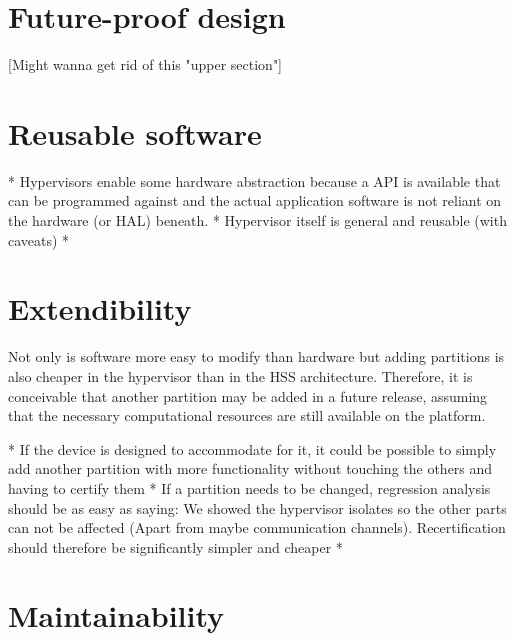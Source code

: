 
\section{Future-proof design}
[Might wanna get rid of this "upper section"]


\section{Reusable software}
* Hypervisors enable some hardware abstraction because a API is available that can be programmed against and the actual application software is not reliant on the hardware (or HAL) beneath.
* Hypervisor itself is general and reusable (with caveats)
* 


\section{Extendibility}
Not only is software more easy to modify than hardware but adding partitions is also cheaper in the hypervisor than in the \gls{HSS} architecture. Therefore, it is conceivable that another partition may be added in a future release, assuming that the necessary computational resources are still available on the platform. 

* If the device is designed to accommodate for
it, it could be possible to simply add another partition with more functionality without touching the others and having to certify them
* If a partition needs to be changed, regression analysis should be as easy as saying: We showed the hypervisor isolates so the other parts can not be affected (Apart from maybe communication channels). Recertification should therefore be significantly simpler and cheaper
* 


\section{Maintainability}

